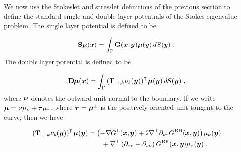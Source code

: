 We now use the Stokeslet and stresslet definitions
of the previous section to define the standard single
and double layer potentials of the Stokes eigenvalue
problem. The single layer potential is defined to
be

\begin{equation}
  {\bf S} {\boldsymbol \mu} ({\boldsymbol x}) = \int_\Gamma {\bf G} ({\boldsymbol x},{\boldsymbol y}) {\boldsymbol \mu}({\boldsymbol y})
  \, dS({\boldsymbol y}) \; .
\end{equation}
The double layer potential is defined to be

\begin{equation} \label{eq:doublelayer}
  {\bf D} {\boldsymbol \mu} ({\boldsymbol x}) = \int_\Gamma \left ( {\bf T}_{\cdot,\cdot,k}\nu_k({\boldsymbol y})
  \right )^\intercal {\boldsymbol \mu}({\boldsymbol y}) \, dS({\boldsymbol y}) \; ,
\end{equation}
where ${\boldsymbol \nu}$ denotes the outward unit normal to the boundary.
If we write ${\boldsymbol \mu} = {\boldsymbol \nu} \mu_\nu + {\boldsymbol \tau} \mu_\tau$,
where ${\boldsymbol \tau} = {\boldsymbol \mu}^\bot$ is the positively oriented unit
tangent to the curve, then we have

\begin{align} \label{eq:stokesdlkernel}
  \left ( {\bf T}_{\cdot,\cdot,k}\nu_k({\boldsymbol y}) \right )^\intercal
  {\boldsymbol \mu}({\boldsymbol y}) &= \left ( - \nabla G^{\textrm{L}}({\boldsymbol x},{\boldsymbol y}) + 2 \nabla^\bot
  \partial_{\nu\tau} G^{\textrm{BH}}({\boldsymbol x},{\boldsymbol y}) \right ) \mu_\nu({\boldsymbol y}) \nonumber \\
  & \qquad+
  \nabla^\bot \left (\partial_{\tau\tau}-\partial_{\nu\nu} \right )
  G^{\textrm{BH}}({\boldsymbol x},{\boldsymbol y}) \mu_\tau({\boldsymbol y}) \; .
\end{align}

